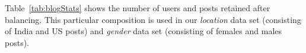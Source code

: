 \documentclass[11pt,letterpaper]{article}
\newcommand{\tabref}[1]{Table~\ref{#1}} %
\begin{document}
\tabref{tab:blogStats} shows the number of users and posts retained after balancing. This particular composition is used in our {\it location} data set (consisting of India and US posts) and {\it gender} data set (consisting of females and males posts). %


\begin{comment}
\begin{table}[ht]
\centering
\scalebox{0.9}{
\renewcommand{\arraystretch}{1.05}
\begin{tabular}{p{1.5cm}|c|c|c}
\hline
Data    & Profiles & Posts & Tokens\\
\hline
\hline
\multicolumn{4}{c}{Location}\\
\hline
India & 1,520 & 34,987 & \\
US & 1,520 & 32,782 & \\
\hline
\hline
\multicolumn{4}{c}{Gender}\\
\hline 
Male & 1,818 & 44,299 & \\ 
Female & 1,818 & 45,980 &\\
\hline
\end{tabular}
}
\caption{Blog statistics.}
\label{tab:datasetStats}
\end{table}
\end{comment}



\begin{comment}
\begin{table}[ht]
\centering
\scalebox{0.9}{
\renewcommand{\arraystretch}{1.05}
\begin{tabular}{p{1.8cm}|c|c|c|c}
\hline
Dataset & Users$_{1}$ & Posts$_{1}$ & Users$_{2}$ & Posts$_{2}$\\
\hline
\hline
location & 1,520 & 34,987 & 1,520 & 32,782 \\
\hline
gender & 1,818 & 44,299 & 1,818 & 45,980 \\
\hline
\end{tabular}
}
\caption{User and post counts for each class in various datasets (class$_{1}$-class$_{2}$).}
\label{tab:datasetStats}
\end{table}
\end{comment}
\end{document}
